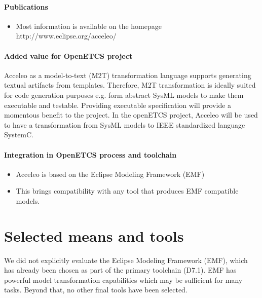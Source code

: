 \paragraph{Publications} %
\begin{itemize}
\item Most information is available on the homepage http://www.eclipse.org/acceleo/
\end{itemize}

\paragraph{Added value for OpenETCS project}


Acceleo as a model-to-text (M2T) transformation language supports generating textual artifacts from templates. Therefore, M2T transformation is ideally suited for code generation purposes e.g. form abstract SysML models to make them executable and testable. Providing executable specification will provide a momentous benefit to the project. In the openETCS project, Acceleo will be used to have a transformation from SysML models to IEEE standardized language SystemC. 


\paragraph{Integration in OpenETCS process and toolchain}

\begin{itemize}
\item Acceleo is based on the Eclipse Modeling Framework (EMF)
\item This brings compatibility with any tool that produces EMF compatible models.
\end{itemize}

\section{Selected means and tools}

We did not explicitly evaluate the Eclipse Modeling Framework (EMF), which has already been chosen as part of the primary toolchain (D7.1).  EMF has powerful model transformation capabilities which may be sufficient for many tasks.  Beyond that, no other final tools have been selected.

